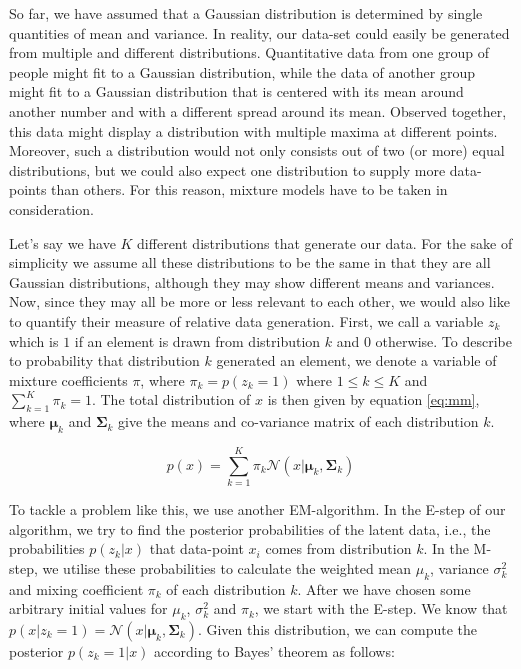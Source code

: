 So far, we have assumed that a Gaussian distribution is determined by single quantities of mean and variance. In reality, our data-set could easily be generated from multiple and different distributions. Quantitative data from one group of people might fit to a Gaussian distribution, while the data of another group might fit to a Gaussian distribution that is centered with its mean around another number and with a different spread around its mean. Observed together, this data might display a distribution with multiple maxima at different points. Moreover, such a distribution would not only consists out of two (or more) equal distributions, but we could also expect one distribution to supply more data-points than others. For this reason, mixture models have to be taken in consideration.

Let's say we have $K$ different distributions that generate our data. For the sake of simplicity we assume all these distributions to be the same in that they are all Gaussian distributions, although they may show different means and variances. Now, since they may all be more or less relevant to each other, we would also like to quantify their measure of relative data generation. First, we call a variable $z_k$ which is $1$ if an element is drawn from distribution $k$ and $0$ otherwise. To describe to probability that distribution $k$ generated an element, we denote a variable of mixture coefficients $\pi$, where $\pi_k = p(z_k=1)$ where $1 \leq k \leq K$ and $\sum_{k=1}^K \pi_k = 1$. The total distribution of $x$ is then given by equation \ref{eq:mm}, where $\bm{\mu}_k$ and $\bm{\Sigma}_k$ give the means and co-variance matrix of each distribution $k$.

\begin{equation}\label{eq:mm}
    p(x) = \sum_{k=1}^K \pi_k \mathcal{N}(x|\bm{\mu}_k, \bm{\Sigma}_k)
\end{equation}

To tackle a problem like this, we use another EM-algorithm. In the E-step of our algorithm, we try to find the posterior probabilities of the latent data, i.e., the probabilities $p(z_k|x)$ that data-point $x_i$ comes from distribution $k$. In the M-step, we utilise these probabilities to calculate the weighted mean $\mu_k$, variance $\sigma^2_k$ and mixing coefficient $\pi_k$ of each distribution $k$. After we have chosen some arbitrary initial values for $\mu_k$, $\sigma^2_k$ and $\pi_k$, we start with the E-step.
We know that $p(x|z_k=1) = \mathcal{N}(x|\bm{\mu}_k, \bm{\Sigma}_k)$. Given this distribution, we can compute the posterior $p(z_k=1|x)$ according to Bayes' theorem as follows:

